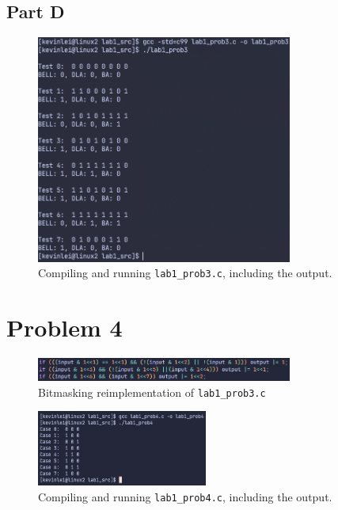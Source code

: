 \documentclass{article}
\begin{document}
\subsection{Part D}
\begin{figure}[H]
    \centering
    \includegraphics[width=0.75\textwidth]{./images/prob3partd.png}
    \caption{Compiling and running \lstinline!lab1_prob3.c!, including the output.}
\end{figure}

\section{Problem 4}

\begin{figure}[H]
    \centering
    \includegraphics[width=0.75\textwidth]{./images/prob4part1.png}
    \caption{Bitmasking reimplementation of \lstinline!lab1_prob3.c!}
\end{figure}

\begin{figure}[H]
    \centering
    \includegraphics[width=0.5\textwidth]{./images/prob4part2.png}
    \caption{Compiling and running \lstinline!lab1_prob4.c!, including the output.}
\end{figure}
\end{document}
